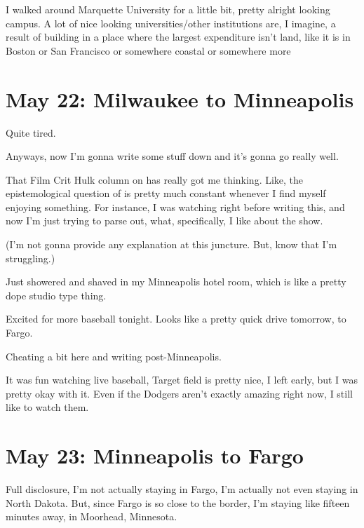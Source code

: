 \documentclass[../butidigress.tex]{subfiles}
\begin{document}
I walked around Marquette University for a little bit, pretty alright looking campus.
A lot of nice looking universities/other institutions are, I imagine, a result of building in a place where the largest expenditure isn't land, like it is in Boston or San Francisco or somewhere coastal or somewhere more 

\section{May 22: Milwaukee to Minneapolis}
Quite tired.

Anyways, now I'm gonna write some stuff down and it's gonna go really well.

That Film Crit Hulk column on \href{http://observer.com/2018/05/the-two-crucial-filmmaking-elements-causing-all-your-movie-feuds/}{} has really got me thinking.
Like, the epistemological question of  is pretty much constant whenever I find myself enjoying something.
For instance, I was watching  right before writing this, and now I'm just trying to parse out, what, specifically, I like about the show.

(I'm not gonna provide any explanation at this juncture.
But, know that I'm struggling.)

\entryskip

Just showered and shaved in my Minneapolis hotel room, which is like a pretty dope studio type thing.

Excited for more baseball tonight.
Looks like a pretty quick drive tomorrow, to Fargo.

Cheating a bit here and writing post-Minneapolis.

It was fun watching live baseball, Target field is pretty nice, I left early, but I was pretty okay with it.
Even if the Dodgers aren't exactly amazing right now, I still like to watch them.

\section{May 23: Minneapolis to Fargo}
Full disclosure, I'm not actually staying in Fargo, I'm actually not even staying in North Dakota.
But, since Fargo is so close to the border, I'm staying like fifteen minutes away, in Moorhead, Minnesota.
\end{document}
